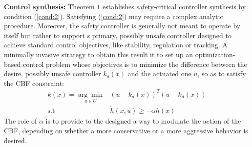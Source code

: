 \textbf{Control synthesis:} Theorem $1$ establishes safety-critical controller synthesis by condition (\ref{cond:2}). Satisfying  (\ref{cond:2}) may require a complex analytic procedure. Moreover, the safety controller is generally not meant to operate by itself but rather to support s primary, possibly unsafe controller designed to achieve standard control objectives, like stability, regulation or tracking. A minimally invasive strategy to obtain this result it to set up an optimization-based control problem whose objectives is to minimize the difference between the desire, possibly unsafe controller $k_d(x)$ and the actuated one $u$, so as to satisfy the CBF constraint:
\begin{equation}
\begin{aligned}
k(x)=\underset{u\in U}{\arg\min}  &(u-k_d(x))^T(u-k_d(x)) \\ 
\mathrm{s.t}\,\, &\dot{h}(x,u)\geq -\alpha h(x)
\end{aligned}
\end{equation}
The role of $\alpha$ is to provide to the designed a way to modulate the action of the CBF, depending on whether a more conservative or a more aggressive behavior is desired.